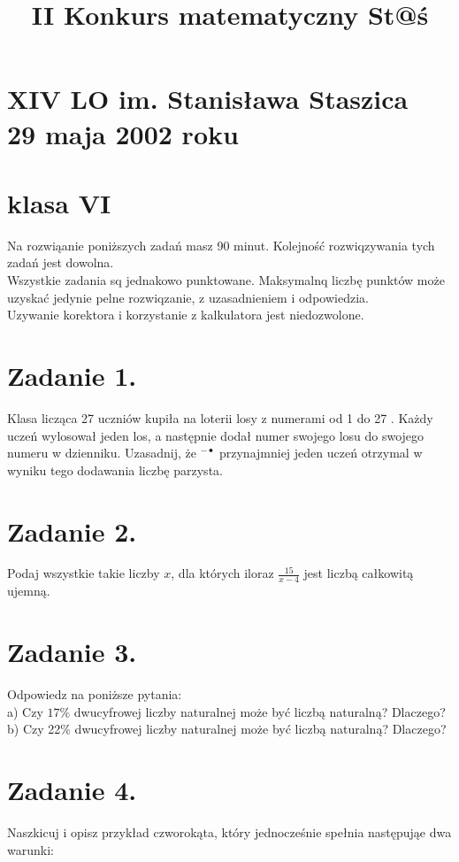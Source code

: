 \documentclass[10pt]{article}
\title{II Konkurs matematyczny St@ś }
\author{}
\date{}
\begin{document}
\maketitle
\section*{XIV LO im. Stanisława Staszica \\
 29 maja 2002 roku}
\section*{klasa VI}
Na rozwiąanie poniższych zadań masz 90 minut. Kolejność rozwiqzywania tych zadań jest dowolna.\\
Wszystkie zadania sq jednakowo punktowane. Maksymalnq liczbę punktów może uzyskać jedynie pelne rozwiqzanie, z uzasadnieniem i odpowiedzia.\\
Uzywanie korektora i korzystanie z kalkulatora jest niedozwolone.

\section*{Zadanie 1.}
Klasa licząca 27 uczniów kupiła na loterii losy z numerami od 1 do 27 . Każdy uczeń wylosował jeden los, a następnie dodał numer swojego losu do swojego numeru w dzienniku. Uzasadnij, że \({ }^{-\bullet}\) przynajmniej jeden uczeń otrzymal w wyniku tego dodawania liczbę parzysta.

\section*{Zadanie 2.}
Podaj wszystkie takie liczby \(x\), dla których iloraz \(\frac{15}{x-4}\) jest liczbą całkowitą ujemną.

\section*{Zadanie 3.}
Odpowiedz na poniższe pytania:\\
a) Czy \(17 \%\) dwucyfrowej liczby naturalnej może być liczbą naturalną? Dlaczego?\\
b) Czy 22\% dwucyfrowej liczby naturalnej może być liczbą naturalną? Dlaczego?

\section*{Zadanie 4.}
Naszkicuj i opisz przykład czworokąta, który jednocześnie spełnia następująe dwa warunki:
\end{document}
